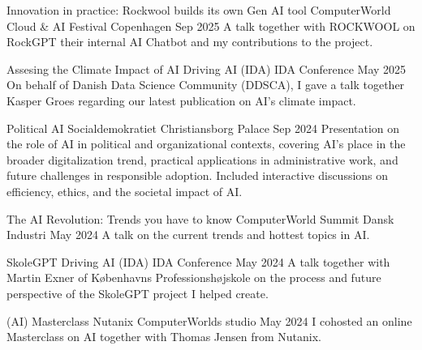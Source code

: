 

\begin{cventries}

    \cventry
    {Innovation in practice: Rockwool builds its own Gen AI tool} %
    {ComputerWorld Cloud \& AI Festival} %
    {Copenhagen} %
    {Sep 2025} %
    {
      A talk together with ROCKWOOL on RockGPT their internal AI Chatbot and my contributions to the project.
    }

    \cventry
    {Assesing the Climate Impact of AI} %
    {Driving AI (IDA)} %
    {IDA Conference} %
    {May 2025} %
    {
      On behalf of Danish Data Science Community (DDSCA), I gave a talk together Kasper Groes regarding our latest publication on AI's climate impact.
    }

    \cventry
    {Political AI} %
    {Socialdemokratiet} %
    {Christiansborg Palace} %
    {Sep 2024} %
    {
      Presentation on the role of AI in political and organizational contexts, covering AI’s place in the broader digitalization trend, practical applications in administrative work, and future challenges in responsible adoption. Included interactive discussions on efficiency, ethics, and the societal impact of AI.
    }

    \cventry
    {The AI Revolution: Trends you have to know} %
    {ComputerWorld Summit} %
    {Dansk Industri} %
    {May 2024} %
    {
      A talk on the current trends and hottest topics in AI.
    }

    \cventry
    {SkoleGPT} %
    {Driving AI (IDA)} %
    {IDA Conference} %
    {May 2024} %
    {
      A talk together with Martin Exner of Københavns Professionshøjskole on the process and future perspective of the SkoleGPT project I helped create.
    }

    \cventry
    {(AI) Masterclass} %
    {Nutanix} %
    {ComputerWorlds studio} %
    {May 2024} %
    {
      I cohosted an online Masterclass on AI together with Thomas Jensen from Nutanix.
    }


\end{cventries}
